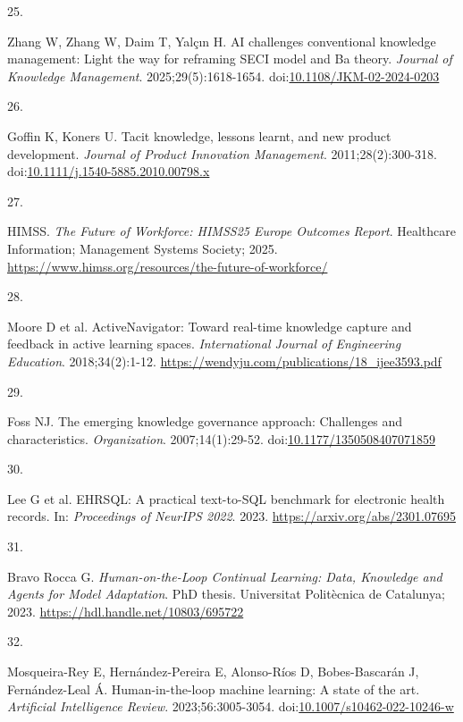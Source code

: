 \documentclass[
  american,
  11pt,
  letterpaper,
  oneside  ,captions=tableheading
]{scrartcl}
\newlength{\cslhangindent}
\newlength{\csllabelwidth}
\newenvironment{CSLReferences}[2] %
 {\begin{list}{}{%
  \setlength{\itemindent}{0pt}
  \setlength{\leftmargin}{0pt}
  \setlength{\parsep}{0pt}
  \ifodd #1
   \setlength{\leftmargin}{\cslhangindent}
   \setlength{\itemindent}{-1\cslhangindent}
  \fi
  \setlength{\itemsep}{#2\baselineskip}}}
 {\end{list}}
\newcommand{\CSLLeftMargin}[1]{\parbox[t]{\csllabelwidth}{\strut#1\strut}}
\newcommand{\CSLRightInline}[1]{\parbox[t]{\linewidth - \csllabelwidth}{\strut#1\strut}}
\begin{document}
\begin{CSLReferences}{0}{1}
\CSLLeftMargin{25. }%
\CSLRightInline{Zhang W, Zhang W, Daim T, Yalçın H. {{AI} challenges
conventional knowledge management: Light the way for reframing {SECI}
model and Ba theory}. \emph{Journal of Knowledge Management}.
2025;29(5):1618-1654.
doi:\href{https://doi.org/10.1108/JKM-02-2024-0203}{10.1108/JKM-02-2024-0203}}

\CSLLeftMargin{26. }%
\CSLRightInline{Goffin K, Koners U. {Tacit knowledge, lessons learnt,
and new product development}. \emph{Journal of Product Innovation
Management}. 2011;28(2):300-318.
doi:\href{https://doi.org/10.1111/j.1540-5885.2010.00798.x}{10.1111/j.1540-5885.2010.00798.x}}

\CSLLeftMargin{27. }%
\CSLRightInline{HIMSS. \emph{{The Future of Workforce: HIMSS25 Europe
Outcomes Report}}. Healthcare Information; Management Systems Society;
2025. \url{https://www.himss.org/resources/the-future-of-workforce/}}

\CSLLeftMargin{28. }%
\CSLRightInline{{Moore D et al.} {ActiveNavigator: Toward real-time
knowledge capture and feedback in active learning spaces}.
\emph{International Journal of Engineering Education}. 2018;34(2):1-12.
\url{https://wendyju.com/publications/18_ijee3593.pdf}}

\CSLLeftMargin{29. }%
\CSLRightInline{Foss NJ. {The emerging knowledge governance approach:
Challenges and characteristics}. \emph{Organization}. 2007;14(1):29-52.
doi:\href{https://doi.org/10.1177/1350508407071859}{10.1177/1350508407071859}}

\CSLLeftMargin{30. }%
\CSLRightInline{{Lee G et al.} {EHRSQL: A practical text-to-SQL
benchmark for electronic health records}. In: \emph{Proceedings of
NeurIPS 2022}. 2023. \url{https://arxiv.org/abs/2301.07695}}

\CSLLeftMargin{31. }%
\CSLRightInline{Bravo Rocca G. \emph{Human-on-the-Loop Continual
Learning: Data, Knowledge and Agents for Model Adaptation}. PhD thesis.
Universitat Polit{è}cnica de Catalunya; 2023.
\url{https://hdl.handle.net/10803/695722}}

\CSLLeftMargin{32. }%
\CSLRightInline{Mosqueira-Rey E, Hernández-Pereira E, Alonso-Ríos D,
Bobes-Bascarán J, Fernández-Leal Á. Human-in-the-loop machine learning:
A state of the art. \emph{Artificial Intelligence Review}.
2023;56:3005-3054.
doi:\href{https://doi.org/10.1007/s10462-022-10246-w}{10.1007/s10462-022-10246-w}}


\end{CSLReferences}
\end{document}
